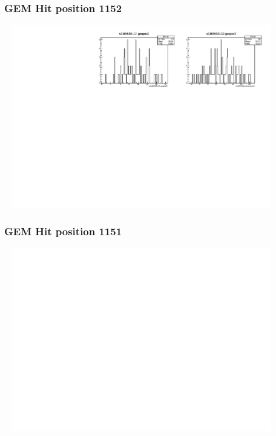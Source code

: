\documentclass[slidestop,compress,mathserif]{beamer}
\begin{document}
\begin{frame}\frametitle{GEM Hit position 1152}
	 \includegraphics[width=12cm,height=8cm]{GEM_Hit_position_1152.pdf}
\end{frame}
\begin{frame}\frametitle{GEM Hit position 1151}
	 \includegraphics[width=12cm,height=8cm]{GEM_Hit_position_1151.pdf}
\end{frame}
\end{document}
